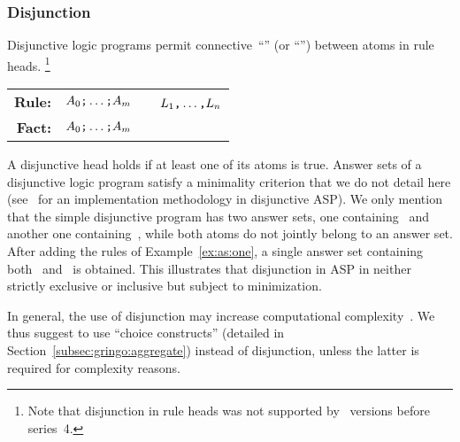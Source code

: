 \subsubsection{Disjunction}\label{subsec:gringo:disjunction}
Disjunctive logic programs permit connective~``\code{;}'' (or ``\code{|}'') between atoms in rule heads.%
\footnote{Note that disjunction in rule heads was not supported by \clasp\ versions before series~4.}
\par
\medskip
\begin{tabular}{rl@{}l}\label{eq:normal:rule}
\textbf{Rule:} & $A_0\text{\texttt{;}}\dots\text{\texttt{;}}A_m$&~\code{:-}~$L_1\text{\texttt{,}}\dots\text{\texttt{,}}L_n$\code{.}
\\
\textbf{Fact:} & $A_0\text{\texttt{;}}\dots\text{\texttt{;}}A_m$&\code{.}
\end{tabular}
%
%
\par
\medskip
\noindent
A disjunctive head holds if at least one of its atoms is true.
Answer sets of a disjunctive logic program satisfy a minimality criterion
that we do not detail here
(see~\cite{eitpol06a,gekasc11b} for an implementation methodology in disjunctive ASP).
We only mention that the simple disjunctive program  has two answer sets,
one containing~ and another one containing~,
while both atoms do not jointly belong to an answer set.
After adding the rules of Example~\ref{ex:as:one}, a single answer set containing both~ and~ is obtained.
This illustrates that disjunction in ASP in neither strictly exclusive or inclusive but subject to minimization.

In general, the use of disjunction may increase
computational complexity~\cite{eitgot95a}.
We thus suggest to use ``choice constructs'' (detailed in Section~\ref{subsec:gringo:aggregate})
instead of disjunction, unless the latter is required for complexity reasons.

